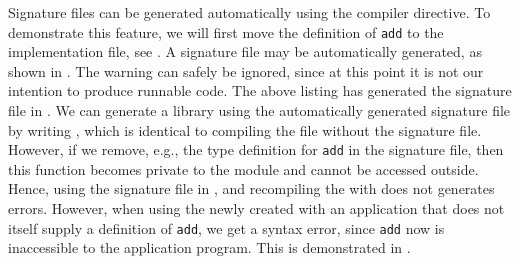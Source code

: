 Signature files can be generated automatically using the  compiler directive. To demonstrate this feature, we will first move the definition of \lstinline{add} to the implementation file, see .
%
%
A signature file may be automatically generated, as shown in .
%
%
The warning can safely be ignored, since at this point it is not our intention to produce runnable code. The above listing has generated the signature file in .
%
%
We can generate a library using the automatically generated signature file by writing , which is identical to compiling the  file without the signature file. However, if we remove, e.g., the type definition for \lstinline{add} in the signature file, then this function becomes private to the module and cannot be accessed outside. Hence, using the signature file in , and recompiling the  with  does not generates errors. 
%
%
%
%
However, when using the newly created  with an application that does not itself supply a definition of \lstinline{add}, we get a syntax error, since \lstinline{add} now is inaccessible to the application program. This is demonstrated in .
%
%
%



